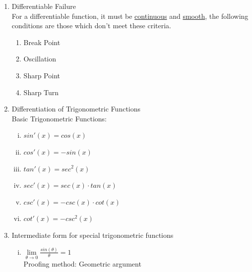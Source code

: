 \documentclass[12px]{article}
\begin{document}
\begin{enumerate}
    \item Differentiable Failure\\
    \hspace*{2em} For a differentiable function, it must be \underline{continuous} and \underline{smooth}, the following conditions are those which don't meet these criteria.
    \begin{multicols}{2}
        \begin{enumerate}[(1)]
            \item Break Point
            \item Oscillation
            \item Sharp Point
            \item Sharp Turn
        \end{enumerate}
    \end{multicols}
    \item Differentiation of Trigonometric Functions\\
    Basic Trigonometric Functions:
    \begin{multicols}{2}
        \begin{enumerate}[i.]
            \item $sin'(x)=cos(x)$
            \item $cos'(x)=-sin(x)$
            \item $tan'(x)=sec^2(x)$
            \item $sec'(x)=sec(x)\cdot tan(x)$
            \item $csc'(x)=-csc(x)\cdot cot(x)$
            \item $cot'(x)=-csc^2(x)$
        \end{enumerate}
    \end{multicols}
\newpage
        \item Intermediate form for special trigonometric functions
        \begin{enumerate}[i.]
            \item $\lim\limits_{\theta\to0}\frac{sin(\theta)}{\theta}=1$\\
            Proofing method: Geometric argument\\

\end{enumerate}
\end{enumerate}
\end{document}
